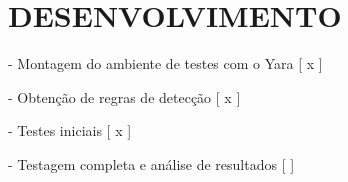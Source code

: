 \chapter{DESENVOLVIMENTO}
\label{c.Desenvolvimento}

- Montagem do ambiente de testes com o Yara [ x ]

- Obtenção de regras de detecção [ x ]

- Testes iniciais [ x ]

- Testagem completa e análise de resultados [ ]
